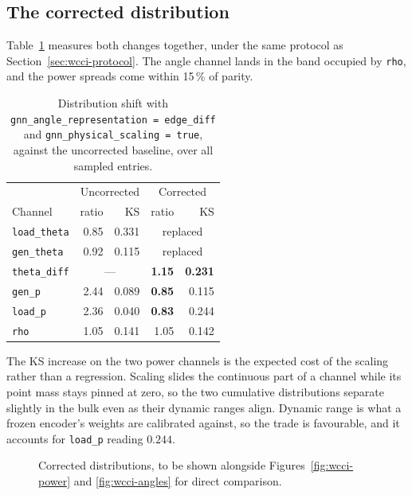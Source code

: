 \subsection{The corrected distribution}
\label{sec:wcci-corrected}

Table~\ref{tab:wcci-corrected} measures both changes together, under the same
protocol as Section~\ref{sec:wcci-protocol}. The angle channel lands in the band
occupied by \texttt{rho}, and the power spreads come within 15\,\% of parity.

\begin{table}[H]
  \centering
  \small
  \caption{Distribution shift with \texttt{gnn\_angle\_representation =
  edge\_diff} and \texttt{gnn\_physical\_scaling = true}, against the
  uncorrected baseline, over all sampled entries.}
  \label{tab:wcci-corrected}
  \setlength{\tabcolsep}{8pt}
  \begin{tabular}{lrr|rr}
    \toprule
    & \multicolumn{2}{c|}{Uncorrected} & \multicolumn{2}{c}{Corrected} \\
    Channel & ratio & KS & ratio & KS \\
    \midrule
    \texttt{load\_theta} & 0.85 & 0.331 & \multicolumn{2}{c}{replaced} \\
    \texttt{gen\_theta}  & 0.92 & 0.115 & \multicolumn{2}{c}{replaced} \\
    \texttt{theta\_diff} & \multicolumn{2}{c|}{---} & \textbf{1.15} & \textbf{0.231} \\
    \texttt{gen\_p}      & 2.44 & 0.089 & \textbf{0.85} & 0.115 \\
    \texttt{load\_p}     & 2.36 & 0.040 & \textbf{0.83} & 0.244 \\
    \texttt{rho}         & 1.05 & 0.141 & 1.05 & 0.142 \\
    \bottomrule
  \end{tabular}
\end{table}

\noindent The KS increase on the two power channels is the expected cost of the scaling
rather than a regression. Scaling slides the continuous part of a channel while
its point mass stays pinned at zero, so the two cumulative distributions
separate slightly in the bulk even as their dynamic ranges align. Dynamic range
is what a frozen encoder's weights are calibrated against, so the trade is
favourable, and it accounts for \texttt{load\_p} reading $0.244$.

\begin{figure}[H]
  \centering
  \caption{Corrected distributions, to be shown alongside
  Figures~\ref{fig:wcci-power} and \ref{fig:wcci-angles} for direct comparison.}
  \label{fig:wcci-corrected}
\end{figure}


